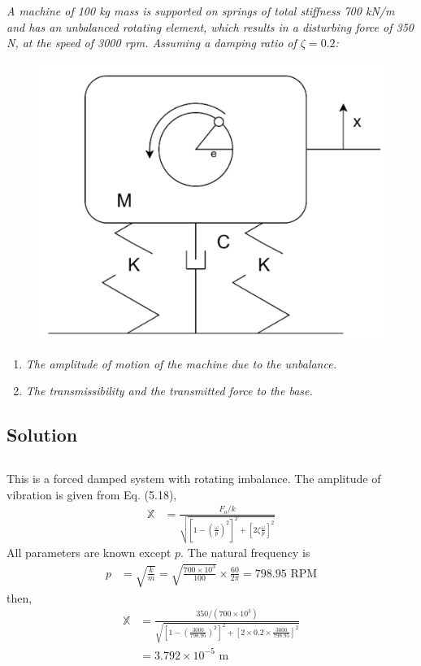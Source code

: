 \section{}
\textit{A machine of 100 kg mass is supported on springs of total stiffness 700 kN/m and has an unbalanced rotating element, which results in a disturbing force of 350 N, at the speed of 3000 rpm. Assuming a damping ratio of $\zeta = 0.2$:}
\begin{figure}[H]
    \centering
    \includegraphics[width=0.5\linewidth]{Questions/Figures/Q4 Problem Diagram.png}
\end{figure}
\begin{enumerate}[label=(\alph*)]
    \item \textit{The amplitude of motion of the machine due to the unbalance.}
    \item \textit{The transmissibility and the transmitted force to the base.}
\end{enumerate}

\subsection*{Solution}
\subsection{}
This is a forced damped system with rotating imbalance. The amplitude of vibration is given from Eq. (5.18),
\begin{align*}
    \mathbb{X} &= \frac{F_o/k}{\sqrt{\left[1 - \left(\frac{\omega}{p} \right)^2 \right]^2 + \left[2 \zeta \frac{\omega}{p} \right]^2}}
\end{align*}
All parameters are known except $p$. The natural frequency is
\begin{align*}
    p &= \sqrt{\frac{k}{m}} = \sqrt{\frac{700 \times 10^3}{100}} \times \frac{60}{2\pi} = 798.95 \text{ RPM}
\end{align*}
then,
\begin{align*}
    \mathbb{X} &= \frac{350/(700\times 10^3)}{\sqrt{\left[1 - \left(\frac{3000}{798.95} \right)^2 \right]^2 + \left[2 \times 0.2 \times \frac{3000}{798.95} \right]^2}} \\
    &= \boxed{3.792 \times 10^{-5} \text{ m}}
\end{align*}

